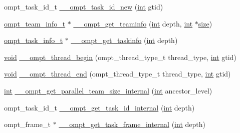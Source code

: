 \begin{DoxyCompactItemize}
\item 
ompt\-\_\-task\-\_\-id\-\_\-t \hyperlink{ompt-specific_8h_a00dc76b44da40dee97e27a16c472e0ca}{\-\_\-\-\_\-ompt\-\_\-task\-\_\-id\-\_\-new} (\hyperlink{ittnotify__static_8h_a8b8dcd723308a8cb5d84277c7a3fff70}{int} gtid)
\item 
\hyperlink{structompt__team__info__t}{ompt\-\_\-team\-\_\-info\-\_\-t} $\ast$ \hyperlink{ompt-specific_8h_a89edd4fa7a424dfc144f73cedde5116c}{\-\_\-\-\_\-ompt\-\_\-get\-\_\-teaminfo} (\hyperlink{ittnotify__static_8h_a8b8dcd723308a8cb5d84277c7a3fff70}{int} depth, \hyperlink{ittnotify__static_8h_a8b8dcd723308a8cb5d84277c7a3fff70}{int} $\ast$\hyperlink{ittnotify__static_8h_a5a1daa0c1d342747e3884fa54fc64fb1}{size})
\item 
\hyperlink{structompt__task__info__t}{ompt\-\_\-task\-\_\-info\-\_\-t} $\ast$ \hyperlink{ompt-specific_8h_a31168da811886ba5fef353af949900b3}{\-\_\-\-\_\-ompt\-\_\-get\-\_\-taskinfo} (\hyperlink{ittnotify__static_8h_a8b8dcd723308a8cb5d84277c7a3fff70}{int} depth)
\item 
\hyperlink{ittnotify__static_8h_af941d56e55e3c5465135b60c4d6343ed}{void} \hyperlink{ompt-specific_8h_ac67291ade668df85fa534e15aa1041e6}{\-\_\-\-\_\-ompt\-\_\-thread\-\_\-begin} (ompt\-\_\-thread\-\_\-type\-\_\-t thread\-\_\-type, \hyperlink{ittnotify__static_8h_a8b8dcd723308a8cb5d84277c7a3fff70}{int} gtid)
\item 
\hyperlink{ittnotify__static_8h_af941d56e55e3c5465135b60c4d6343ed}{void} \hyperlink{ompt-specific_8h_a6df3ac9845bff98373f885b319bc2e38}{\-\_\-\-\_\-ompt\-\_\-thread\-\_\-end} (ompt\-\_\-thread\-\_\-type\-\_\-t thread\-\_\-type, \hyperlink{ittnotify__static_8h_a8b8dcd723308a8cb5d84277c7a3fff70}{int} gtid)
\item 
\hyperlink{ittnotify__static_8h_a8b8dcd723308a8cb5d84277c7a3fff70}{int} \hyperlink{ompt-specific_8h_a19ec7ae68097df67ab10aafe2ac2ebbc}{\-\_\-\-\_\-ompt\-\_\-get\-\_\-parallel\-\_\-team\-\_\-size\-\_\-internal} (\hyperlink{ittnotify__static_8h_a8b8dcd723308a8cb5d84277c7a3fff70}{int} ancestor\-\_\-level)
\item 
ompt\-\_\-task\-\_\-id\-\_\-t \hyperlink{ompt-specific_8h_a18b0095c57b9a12664adf9ac87a52062}{\-\_\-\-\_\-ompt\-\_\-get\-\_\-task\-\_\-id\-\_\-internal} (\hyperlink{ittnotify__static_8h_a8b8dcd723308a8cb5d84277c7a3fff70}{int} depth)
\item 
ompt\-\_\-frame\-\_\-t $\ast$ \hyperlink{ompt-specific_8h_af8e9ca4aa0c4492074f01f5c67f6da51}{\-\_\-\-\_\-ompt\-\_\-get\-\_\-task\-\_\-frame\-\_\-internal} (\hyperlink{ittnotify__static_8h_a8b8dcd723308a8cb5d84277c7a3fff70}{int} depth)

\end{DoxyCompactItemize}
